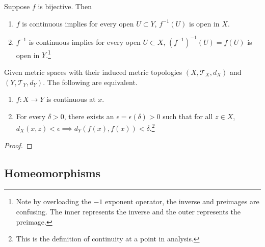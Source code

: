     \begin{theorem}
      Suppose $f$ is bijective. Then 
      \begin{enumerate}
        \item $f$ is continuous implies for every open $U \subset Y$, $f^{-1} (U)$ is open in $X$. 
        \item $f^{-1}$ is continuous implies for every open $U \subset X$, $(f^{-1})^{-1} (U) = f(U)$ is open in $Y$.\footnote{Note by overloading the $-1$ exponent operator, the inverse and preimages are confusing. The inner represents the inverse and the outer represents the preimage. }
      \end{enumerate}
    \end{theorem} 

    \begin{theorem}[Analytic Continuity = Topological Continuity] 
      Given metric spaces with their induced metric topologies $(X, \mathscr{T}_X, d_X)$ and $(Y, \mathscr{T}_Y, d_Y)$. The following are equivalent. 
      \begin{enumerate}
        \item $f: X \rightarrow Y$ is continuous at $x$. 
        \item For every $\delta > 0$, there exists an $\epsilon = \epsilon(\delta) > 0$ such that for all $z \in X$, $d_X (x, z) < \epsilon \implies d_Y (f(x), f(x)) < \delta$.\footnote{This is the definition of continuity at a point in analysis.} 
      \end{enumerate}
    \end{theorem}
    \begin{proof}
      
    \end{proof}

  \subsection{Homeomorphisms}


